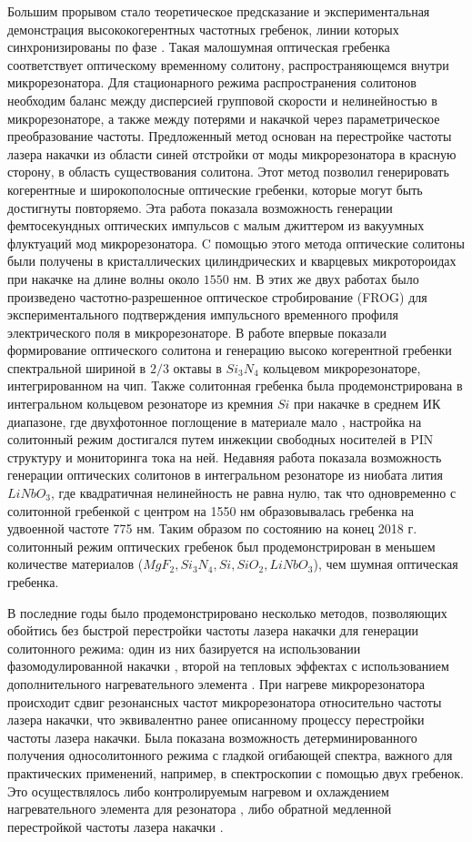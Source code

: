 Большим прорывом стало теоретическое предсказание и экспериментальная демонстрация высококогерентных частотных гребенок, линии которых синхронизированы по фазе \cite{Herr2014}. Такая малошумная оптическая гребенка соответствует оптическому временному солитону, распространяющемся внутри микрорезонатора. Для стационарного режима распространения солитонов необходим баланс между дисперсией групповой скорости и нелинейностью в микрорезонаторе, а также между потерями и накачкой через параметрическое преобразование частоты. Предложенный метод основан на перестройке частоты лазера накачки из области синей отстройки от моды микрорезонатора в красную сторону, в область существования солитона. Этот метод позволил генерировать когерентные и широкополосные оптические гребенки, которые могут быть достигнуты повторяемо. Эта работа показала возможность генерации фемтосекундных оптических импульсов с малым джиттером из вакуумных флуктуаций мод микрорезонатора. C помощью этого метода оптические солитоны были получены в кристаллических цилиндрических \cite{Herr2014} и кварцевых микротороидах \cite{Yi2015} при накачке на длине волны около $1550$ нм. В этих же двух работах было произведено частотно-разрешенное оптическое стробирование (FROG) для экспериментального подтверждения импульсного временного профиля электрического поля в микрорезонаторе. В работе \cite{Brasch2016} впервые показали формирование оптического солитона и генерацию высоко когерентной гребенки спектральной шириной в $2/3$ октавы в $Si_3N_4$ кольцевом микрорезонаторе, интегрированном на чип. Также солитонная гребенка была продемонстрирована в интегральном кольцевом резонаторе из кремния $Si$ при накачке в среднем ИК диапазоне, где двухфотонное поглощение в материале мало \cite{Yu2016}, настройка на солитонный режим достигался путем инжекции свободных носителей в PIN структуру и мониторинга тока на ней. Недавняя работа показала возможность генерации оптических солитонов в интегральном резонаторе из ниобата лития $LiNbO_3$, где квадратичная нелинейность не равна нулю, так что одновременно с солитонной гребенкой с центром на 1550 нм образовывалась гребенка на удвоенной частоте 775 нм. Таким образом по состоянию на конец 2018 г. солитонный режим оптических гребенок был продемонстрирован в меньшем количестве материалов ($MgF_2, Si_3N_4, Si, SiO_2, LiNbO_3$), чем шумная оптическая гребенка.

В последние годы было продемонстрировано несколько методов, позволяющих обойтись без быстрой перестройки частоты лазера накачки для генерации солитонного режима: один из них базируется на использовании фазомодулированной накачки \cite{Jang2015ol}, второй на тепловых эффектах с использованием дополнительного нагревательного элемента \cite{Joshi2016}. При нагреве микрорезонатора происходит сдвиг резонансных частот микрорезонатора относительно частоты лазера накачки, что эквивалентно ранее описанному процессу перестройки частоты лазера накачки. Была показана возможность детерминированного получения односолитонного режима с гладкой огибающей спектра, важного для практических применений, например, в спектроскопии с помощью двух гребенок. Это осуществлялось либо контролируемым нагревом и охлаждением нагревательного элемента для резонатора \cite{Joshi2016}, либо обратной медленной перестройкой частоты лазера накачки \cite{Karpov2017}.

